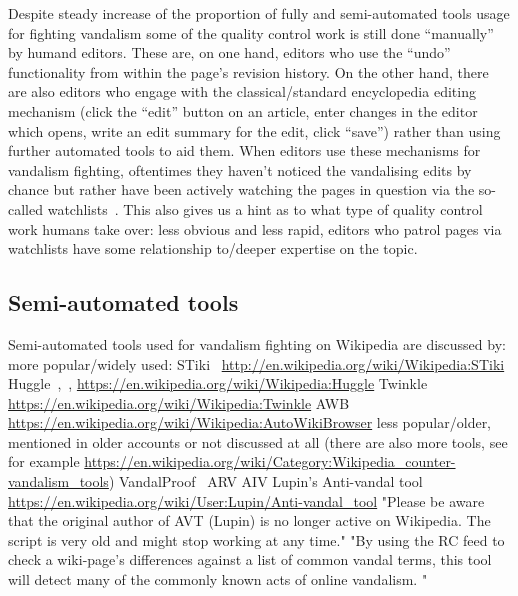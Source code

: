 Despite steady increase of the proportion of fully and semi-automated tools usage for fighting vandalism %
some of the quality control work is still done ``manually'' by humand editors.
These are, on one hand, editors who use the ``undo'' functionality from within the page's revision history.
On the other hand, there are also editors who engage with the classical/standard encyclopedia editing mechanism (click the ``edit'' button on an article, enter changes in the editor which opens, write an edit summary for the edit, click ``save'') rather than using further automated tools to aid them.
When editors use these mechanisms for vandalism fighting, oftentimes they haven't noticed the vandalising edits by chance but rather have been actively watching the pages in question via the so-called watchlists~\cite{AstHal2018}. %
This also gives us a hint as to what type of quality control work humans take over: less obvious and less rapid, editors who patrol pages via watchlists have some relationship to/deeper expertise on the topic. %


\subsection{Semi-automated tools}

Semi-automated tools used for vandalism fighting on Wikipedia are discussed by:
more popular/widely used:
STiki~\cite{WestKanLee2010}
\url{http://en.wikipedia.org/wiki/Wikipedia:STiki}
Huggle~\cite{GeiHal2013},~\cite{HalRied2012},\cite{GeiRib2010}
\url{https://en.wikipedia.org/wiki/Wikipedia:Huggle}
Twinkle
\url{https://en.wikipedia.org/wiki/Wikipedia:Twinkle}
AWB
\url{https://en.wikipedia.org/wiki/Wikipedia:AutoWikiBrowser}
less popular/older, mentioned in older accounts or not discussed at all (there are also more tools, see for example \url{https://en.wikipedia.org/wiki/Category:Wikipedia_counter-vandalism_tools})
VandalProof~\cite{HalRied2012}
ARV
AIV
Lupin's Anti-vandal tool~\cite{GeiRib2010}
\url{https://en.wikipedia.org/wiki/User:Lupin/Anti-vandal_tool}
"Please be aware that the original author of AVT (Lupin) is no longer active on Wikipedia. The script is very old and might stop working at any time."
"By using the RC feed to check a wiki-page's differences against a list of common vandal terms, this tool will detect many of the commonly known acts of online vandalism. "

